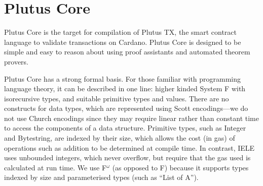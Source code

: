 \documentclass[conference]{IEEEtran}
\newcommand{\Fomega}{F$^{\omega}$}
\begin{document}
\thispagestyle{plain}
\pagestyle{plain}









%
\IEEEpeerreviewmaketitle




\section{Plutus Core}

Plutus Core is the target for compilation of Plutus TX, the smart
contract language to validate transactions on Cardano. Plutus Core is
designed to be simple and easy to reason about using proof assistants
and automated theorem provers.

Plutus Core has a strong formal basis. For those familiar with
programming language theory, it can be described in one line: higher
kinded System F with isorecursive types, and suitable
primitive types and values. There are no constructs for data types,
which are represented using Scott encodings---we do not use Church
encodings since they may require linear rather than constant time to
access the components of a data structure. Primitive types, such as
Integer and Bytestring, are indexed by their size, which allows the
cost (in gas) of operations such as addition to be determined at
compile time. In contrast, IELE uses unbounded integers, which never
overflow, but require that the gas used is calculated at run time. We
use \Fomega{} (as opposed to F) because it supports types indexed by
size and parameterised types (such as ``List of A'').
\end{document}
